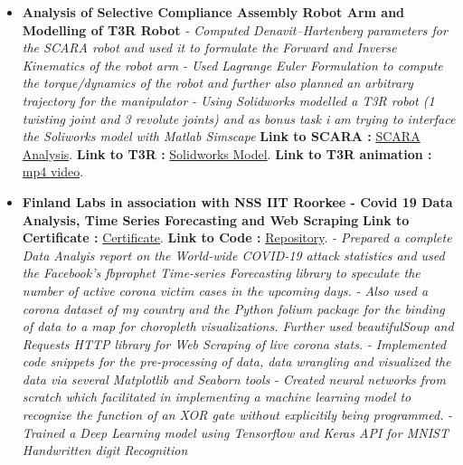 \documentclass[a4paper,12pt]{article}
\begin{document}
\begin{itemize}
    \item{\textbf{\large{Analysis of Selective Compliance Assembly Robot Arm and Modelling of T3R Robot}}
    \newline
    \textit{- Computed Denavit–Hartenberg parameters for the SCARA robot and used it to formulate the Forward and Inverse Kinematics of the robot arm} 
    \newline
    \textit{- Used Lagrange Euler Formulation to compute the torque/dynamics of the robot and further also planned an arbitrary trajectory for the manipulator} 
    \newline
    \textit{- Using Solidworks modelled a T3R robot (1 twisting joint and 3 revolute joints) and as bonus task i am trying to interface the Soliworks model with Matlab Simscape}} 
    \newline
    \textbf{ Link to SCARA :} \href{https://github.com/teetangh/Robotics-Projects/blob/master/SCARA_Robot_Analysis.pdf}{SCARA Analysis}.
    \newline
    \textbf{ Link to T3R :} \href{https://github.com/teetangh/Robotics-Projects/tree/master/T3R%20Robot}{Solidworks Model}.
    \textbf{ Link to T3R animation :} \href{https://github.com/teetangh/Robotics-Projects/blob/master/T3R%20Robot/Resources/T3R%20Animation.mp4}{mp4 video}.
    \newline
    \item{\textbf{\large{Finland Labs in association with NSS IIT Roorkee - Covid 19 Data Analysis, Time Series Forecasting and Web Scraping}}
    \newline
    \textbf{Link to Certificate :} \href{https://github.com/teetangh/Kaustav-All-Certifications/blob/master/Artificial%20Intelligence/Finland%20Labs%20and%20IITR/Covid%2019%20Analysis%20-%20AI%20and%20ML.pdf}{Certificate}.
    \newline
    \textbf{ Link to Code :} \href{https://github.com/teetangh/FinlandLabs-IITR-COVID-19-Analysis}{Repository}.
    \newline
    \textit{- Prepared a complete Data Analyis report on the World-wide COVID-19 attack statistics and used the Facebook's fbprophet Time-series Forecasting library to speculate the number of active corona victim cases in the upcoming days.} 
    \newline
    \textit{- Also used a corona dataset of my country and the Python folium package for the binding of data to a map for choropleth visualizations. Further used beautifulSoup and Requests HTTP library for Web Scraping of live corona stats.}
    \newline
    \textit{- Implemented code snippets for the pre-processing of data, data wrangling and visualized the data via several Matplotlib and Seaborn tools }
    \newline
    \textit{- Created neural networks from scratch which facilitated in implementing a machine learning model to recognize the function of an XOR gate without explicitily being programmed.}
    \newline
    \textit{- Trained a Deep Learning model using Tensorflow and Keras API for MNIST Handwritten digit Recognition}}
    

\end{itemize}
\end{document}
